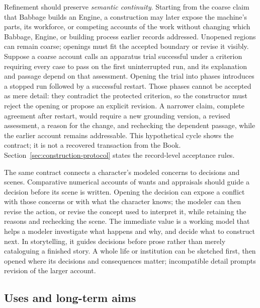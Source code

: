 \documentclass[11pt,a4paper]{article}
\begin{document}
Refinement should preserve \emph{semantic continuity}. Starting from the coarse
claim that Babbage builds an Engine, a construction may later expose the
machine's parts, its workforce, or competing accounts of the work without
changing which Babbage, Engine, or building process earlier records addressed.
Unopened regions can remain coarse; openings must fit the accepted boundary
or revise it visibly. Suppose a coarse account calls an apparatus trial
successful under a criterion requiring every case to pass on the first
uninterrupted run, and its explanation and passage depend on that assessment.
Opening the trial into phases introduces a stopped run followed by a successful
restart. Those phases cannot be accepted as mere detail: they contradict the
protected criterion, so the constructor must reject the opening or propose an
explicit revision. A narrower claim, complete agreement after restart, would
require a new grounding version, a revised assessment, a reason for the
change, and rechecking the dependent passage, while the earlier account remains
addressable. This hypothetical cycle shows the contract; it is not a recovered
transaction from the Book. Section~\ref{sec:construction-protocol} states the record-level
acceptance rules.

The same contract connects a character's modeled concerns to decisions and
scenes. Comparative numerical accounts of wants and appraisals should guide a
decision before its scene is written. Opening the decision can expose a
conflict with those concerns or with what the character knows; the modeler can
then revise the action, or revise the concept used to interpret it, while
retaining the reasons and rechecking the scene. The immediate value is a
working model that helps a modeler investigate what happens and why, and decide
what to construct next. In storytelling, it guides decisions before prose rather
than merely cataloguing a finished story. A whole life or institution can be sketched first, then
opened where its decisions and consequences matter; incompatible detail prompts
revision of the larger account.

\subsection{Uses and long-term aims}
\label{sec:uses}
\end{document}
